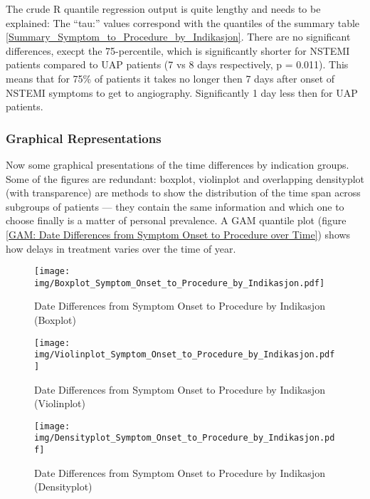 \documentclass[a4paper]{report}
\begin{document}
\begin{itemize}
{The crude R quantile regression output is quite lengthy and needs to be explained: The ``tau:'' values correspond with the quantiles of the summary table \ref{Summary_Symptom_to_Procedure_by_Indikasjon}. There are no significant differences, execpt the 75-percentile, which is significantly shorter for NSTEMI patients compared to UAP patients (7 vs 8 days respectively, p = 0.011). This means that for 75\% of patients it takes no longer then 7 days after onset of NSTEMI symptoms to get to angiography. Significantly 1 day less then for UAP patients.


\clearpage
\subsubsection{Graphical Representations}
Now some graphical presentations of the time differences by indication groups. Some of the figures are redundant: boxplot, violinplot and overlapping densityplot (with transparence) are methods to show the distribution of the time span across subgroups of patients --- they contain the same information and which one to choose finally is a matter of personal prevalence. A GAM quantile plot (figure \ref{GAM: Date Differences from Symptom Onset to Procedure over Time}) shows how delays in treatment varies over the time of year.

\begin{figure}
  \centering
  \caption{Date Differences from Symptom Onset to Procedure by Indikasjon (Boxplot)}
  \label{Boxplot: Date Differences from Symptom Onset to Procedure by Indikasjon}
\texttt{[image: img/Boxplot\_Symptom\_Onset\_to\_Procedure\_by\_Indikasjon.pdf]}\end{figure}


\begin{figure}
  \centering
  \caption{Date Differences from Symptom Onset to Procedure by Indikasjon (Violinplot)}
  \label{Violin: Date Differences from Symptom Onset to Procedure by Indikasjon}
\texttt{[image: img/Violinplot\_Symptom\_Onset\_to\_Procedure\_by\_Indikasjon.pdf]}\end{figure}



\begin{figure}
  \centering
  \caption{Date Differences from Symptom Onset to Procedure by Indikasjon (Densityplot)}
  \label{Density: Date Differences from Symptom Onset to Procedure by Indikasjon}
\texttt{[image: img/Densityplot\_Symptom\_Onset\_to\_Procedure\_by\_Indikasjon.pdf]}\end{figure}



}
\end{itemize}
\end{document}
